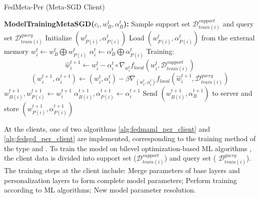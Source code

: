 \documentclass[runningheads]{llncs}
\begin{document}
\begin{algorithm}[h]
    \caption{FedMeta-Per (Meta-SGD Client)} \label{alg:fedsgd_per_client}
    \begin{algorithmic}[1]
        \State\textbf{ModelTrainingMetaSGD($c_i, w_B^t, \alpha_B^t$):}
        \State Sample support set $\mathcal{D}_{train(i)}^{support}$ and query set $\mathcal{D}_{train(i)}^{query}$
            \State Initialize $(w_{P(i)}^t, \alpha_{P(i)}^t)$
        \Else
            \State Load $(w_{P(i)}^t, \alpha_{P(i)}^t)$ from the external memory
        \EndIf
        \State $w_i^t \gets w_B^t \bigoplus w_{P(i)}^t$ 
        \State $\alpha_i^t \gets \alpha_B^t \bigoplus \alpha_{P(i)}^t$ 
        \State Training:
        \begin{dmath*}
            \hat{w}_{i}^{t+1} \gets w_{i}^t - \alpha_i^t\circ\nabla_{w_i^t} f_{local}\left(w_{i}^t, \mathcal{D}_{train(i)}^{support}\right)
        \end{dmath*}
        \begin{dmath*}
            (w_{i}^{t+1}, \alpha_i^{t+1}) \gets (w_{i}^t, \alpha_{i}^{t}) - \beta\nabla_{(w_i^t, \alpha_i^t)} f_{local}\left(\hat{w}_{i}^{t+1}, \mathcal{D}_{train(i)}^{query}\right)
        \end{dmath*}
        \State $w_{B(i)}^{t+1}, w_{P(i)}^{t+1} \gets w_i^{t+1}$ 
        \State $\alpha_{B(i)}^{t+1}, \alpha_{P(i)}^{t+1} \gets \alpha_i^{t+1}$ 
        \State Send $(w_{B(i)}^{t+1}, \alpha_B^{t+1})$ to server and store $(w_{P(i)}^{t+1}, \alpha_{P(i)}^{t+1})$
    \end{algorithmic}
\end{algorithm}

At the clients, one of two algorithms \ref{alg:fedmaml_per_client} and \ref{alg:fedsgd_per_client} are implemented, corresponding to the training method of the type  and  . To train the model on bilevel optimization-based ML algorithms , the client data is divided into support set ($\mathcal{D}_{train(i)}^{support}$) and query set ( $\mathcal{D}_{train(i)}^{query}$). The training steps at the client include: Merge parameters of base layers and personalization layers to form complete model parameters; Perform training according to ML algorithms; New model parameter resolution.
\end{document}
